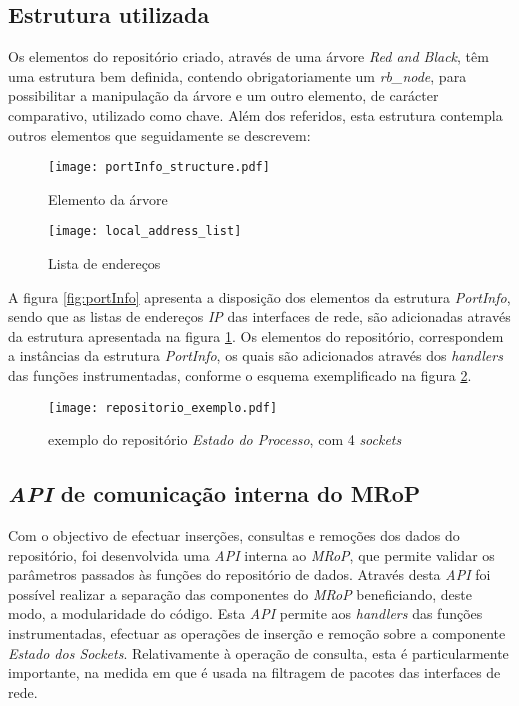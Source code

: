 \subsection{Estrutura utilizada}
\label{sub:repo_structure}

Os elementos do repositório criado, através de uma árvore \textit{Red and Black}, têm uma estrutura bem definida, contendo obrigatoriamente um \textit{rb\_node}, para possibilitar a manipulação da árvore e um outro elemento, de carácter comparativo, utilizado como chave.
Além dos referidos, esta estrutura contempla outros elementos que seguidamente se descrevem:

\begin{figure}[ht]
\begin{minipage}[b]{0.5\linewidth}
\centering
\texttt{[image: portInfo\_structure.pdf]}
\caption{Elemento da árvore}
\label{fig:portInfo}
\end{minipage}
\hspace{0.5cm}
\begin{minipage}[b]{0.5\linewidth}
\centering
\texttt{[image: local\_address\_list]}
\caption{Lista de endereços}
\label{fig:local_address_list}
\end{minipage}
\end{figure}

A figura \ref{fig:portInfo} apresenta a disposição dos elementos da estrutura \textit{PortInfo}, sendo que as listas de endereços \textit{IP} das interfaces de rede, são adicionadas através da estrutura apresentada na figura \ref{fig:local_address_list}.
Os elementos do repositório, correspondem a instâncias da estrutura \textit{PortInfo}, os quais são adicionados através dos \textit{handlers} das funções instrumentadas, conforme o esquema exemplificado na figura \ref{fig:repo_example}.

\begin{figure}[!htbp]
\centering
\texttt{[image: repositorio\_exemplo.pdf]}
\caption{exemplo do repositório \textit{Estado do Processo}, com 4 \textit{sockets}}
\label{fig:repo_example}
\end{figure}


\subsection{\textit{API} de comunicação interna do MRoP}
\label{sub:repo_api}

Com o objectivo de efectuar inserções, consultas e remoções dos dados do repositório, foi desenvolvida uma \textit{API} interna ao \textit{MRoP}, que permite validar os parâmetros passados às funções do repositório de dados.
Através desta \textit{API} foi possível realizar a separação das componentes do \textit{MRoP} beneficiando, deste modo, a modularidade do código.
Esta \textit{API} permite aos \textit{handlers} das funções instrumentadas, efectuar as operações de inserção e remoção sobre a componente \textit{Estado dos Sockets}.
Relativamente à operação de consulta, esta é particularmente importante, na medida em que é usada na filtragem de pacotes das interfaces de rede.


